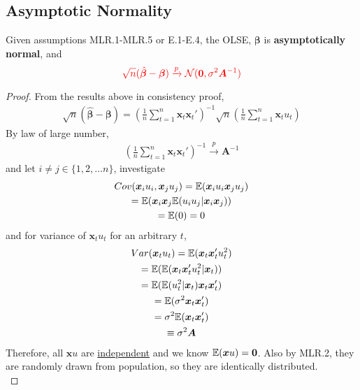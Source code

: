 \documentclass[]{article}
\begin{document}
	\subsection{Asymptotic Normality}
		\begin{theorem}
			Given assumptions MLR.1-MLR.5 or E.1-E.4, the OLSE, $\bm{\beta}$ is \textbf{asymptotically normal}, and
			\begin{equation}
				\textcolor{red}{
				\sqrt{n}(\hat{\bm{\beta}} - \bm{\beta}) \xrightarrow{p} \mathcal{{N}}(\textbf{0}, \sigma^2 \bm{A}^{-1})
				}
			\end{equation}
		\end{theorem}
			\begin{proof}
				From the results above in consistency proof, 
				\begin{gather*}
					\sqrt{n}(\hat{\bm{\beta}} - \bm{\beta}) = (\frac{1}{n} \sum_{t=1}^n \bm{x}_t \bm{x}_t')^{-1} \sqrt{n} (\frac{1}{n} \sum_{t=1}^n \bm{x}_t u_t) 
				\end{gather*}
				By law of large number, 
				\begin{gather*}
					(\frac{1}{n} \sum_{t=1}^n \bm{x}_t \bm{x}_t')^{-1} \xrightarrow{p} \bm{A}^{-1}
				\end{gather*}
				and let $i \neq j \in \{1, 2, \dots n\}$, investigate
				\begin{gather*}
					Cov(\bm{x}_i u_i, \bm{x}_j u_j) = \mathbb{E}({\bm{x}_i u_i  \bm{x}_j u_j}) \\
					= \mathbb{E}({\bm{x}_i \bm{x}_j \mathbb{E}({u_i u_j | \bm{x}_i \bm{x}_j})}) \\
					= \mathbb{E}({0}) = 0
				\end{gather*}
				and for variance of $\bm{x}_t u_t$ for an arbitrary $t$,
				\begin{gather*}
					Var(\bm{x}_t u_t) = \mathbb{E}({\bm{x}_t \bm{x}_t' u_t^2}) \\
					= \mathbb{E}({\mathbb{E}({\bm{x}_t \bm{x}_t' u_t^2 | \bm{x}_t})}) \\
					= \mathbb{E}({\mathbb{E}({u_t^2|\bm{x}_t}) \bm{x}_t \bm{x}_t'}) \\
					= \mathbb{E}({\sigma^2 \bm{x}_t \bm{x}_t'}) \\
					= \sigma^2 \mathbb{E}({\bm{x}_t \bm{x}_t'}) \\
					\equiv \sigma^2 \bm{A}
				\end{gather*}
				Therefore, all $\bm{x} u$ are \ul{independent} and we know $\mathbb{E}({\bm{x} u}) = \bm{0}$. Also by MLR.2, they are randomly drawn from population, so they are identically distributed. \\

\end{proof}
\end{document}
